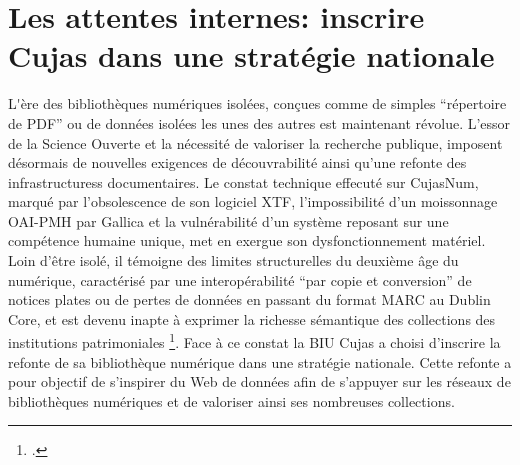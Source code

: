 \chapter[Les attentes internes]{Les attentes internes: inscrire Cujas dans une stratégie nationale}

\lettrine{L}'ère des bibliothèques numériques isolées, conçues comme de simples \enquote{répertoire de \ac{PDF}} ou de données isolées les unes des autres est maintenant révolue. L'essor de la Science Ouverte et la nécessité de valoriser la recherche publique, imposent désormais de nouvelles exigences de découvrabilité ainsi qu'une refonte des infrastructuress documentaires. Le constat technique effecuté sur CujasNum, marqué par l'obsolescence de son logiciel \ac{XTF}, l'impossibilité d'un moissonnage \ac{OAI-PMH} par Gallica et la vulnérabilité d'un système reposant sur une compétence humaine unique, met en exergue son dysfonctionnement matériel. Loin d'être isolé, il témoigne des limites structurelles du deuxième âge du numérique, caractérisé par une interopérabilité \enquote{par copie et conversion} de notices plates ou de pertes de données en passant du format MARC au Dublin Core, et est devenu inapte à exprimer la richesse sémantique des collections des institutions patrimoniales \footcite{bermesTroisAgesNumerique}. Face à ce constat la \ac{BIU Cujas} a choisi d'inscrire la refonte de sa bibliothèque numérique dans une stratégie nationale. Cette refonte a pour objectif de s'inspirer du Web de données afin de s'appuyer sur les réseaux de bibliothèques numériques et de valoriser ainsi ses nombreuses collections.




